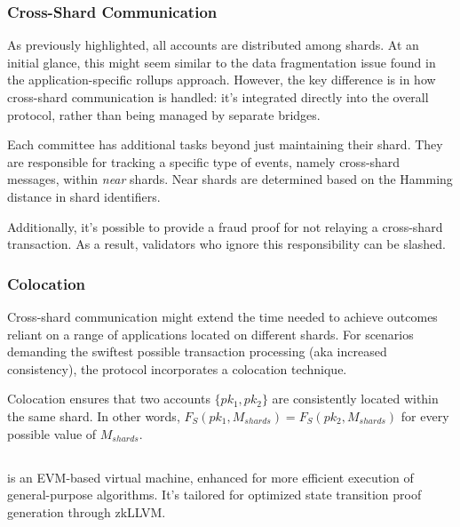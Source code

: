 \subsubsection{Cross-Shard Communication}
\label{section:cross-shard}

As previously highlighted, all accounts are distributed among shards. 
At an initial glance, this might seem similar to the data fragmentation issue 
found in the application-specific rollups approach. 
However, the key difference is in how cross-shard communication is handled: 
it's integrated directly into the overall protocol, 
rather than being managed by separate bridges. 

Each committee has additional tasks beyond just maintaining their shard. 
They are responsible for tracking a specific type of events, namely cross-shard 
messages, within \textit{near} shards. Near shards are determined based on the 
Hamming distance in shard identifiers. 

Additionally, it's possible to provide a fraud proof for not relaying a 
cross-shard transaction. As a result, validators who ignore this responsibility 
can be slashed.

\subsubsection{Colocation}
\label{setion:colocation}

Cross-shard communication might extend the time needed to achieve outcomes 
reliant on a range of applications located on different shards. 
For scenarios demanding the swiftest possible transaction processing (aka
increased consistency), the protocol incorporates a colocation technique. 

Colocation ensures that two accounts $\{pk_1, pk_2\}$ are consistently 
located within the same shard. 
In other words, $F_S(pk_1, M_{shards}) = F_S(pk_2, M_{shards})$ for every 
possible value of $M_{shards}$.

\subsection{\evm}
\label{section:evm}

\evm is an EVM-based virtual machine, enhanced for more efficient execution 
of general-purpose algorithms. It's tailored for optimized state transition 
proof generation through zkLLVM.

